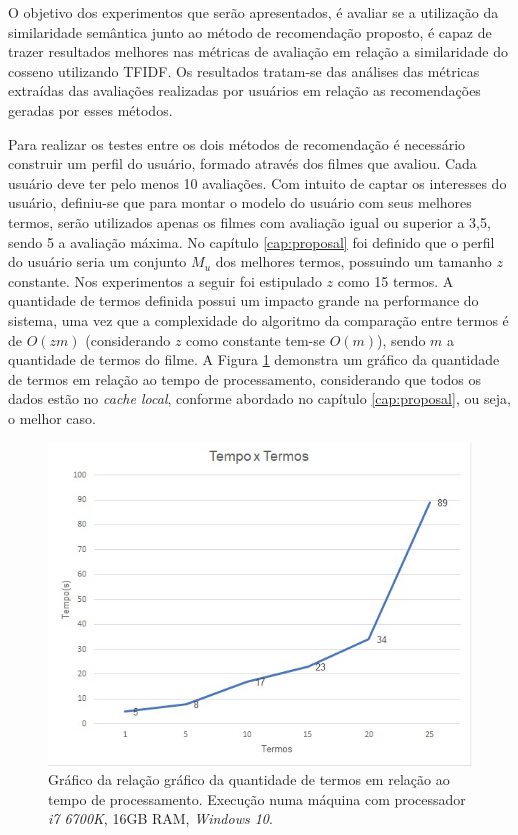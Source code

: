 O objetivo dos experimentos que serão apresentados, é avaliar se a utilização da similaridade semântica junto ao método de recomendação proposto, é capaz de trazer resultados melhores nas métricas de avaliação em relação a similaridade do cosseno utilizando \ac{TFIDF}.  Os resultados tratam-se das análises das métricas extraídas das avaliações realizadas por usuários em relação as recomendações geradas por esses métodos.

Para realizar os testes entre os dois métodos de recomendação é necessário construir um perfil do usuário,
formado através dos filmes que avaliou. Cada usuário deve ter pelo menos 10 avaliações. Com intuito de captar os interesses do usuário, definiu-se que para montar o modelo do usuário com seus melhores termos, serão utilizados apenas os filmes com avaliação igual ou superior a 3,5, sendo 5 a avaliação máxima. No capítulo \ref{cap:proposal} foi definido que o perfil do usuário seria um conjunto $M_u$ dos melhores termos, possuindo um tamanho $z$ constante. Nos experimentos a seguir foi estipulado $z$ como 15 termos. A quantidade de termos definida possui um impacto grande na performance do sistema, uma vez que a complexidade do algoritmo da comparação entre termos é de $O(zm)$ (considerando $z$ como constante tem-se $O(m)$), sendo $m$ a quantidade de termos do filme. A Figura \ref{fig:tempo_x_termos} demonstra um gráfico da quantidade de termos em relação ao tempo de processamento, considerando que todos os dados estão no \textit{cache local}, conforme abordado no capítulo \ref{cap:proposal}, ou seja, o melhor caso.

\begin{figure}
	\centering
	\includegraphics[scale=0.85]{imagens/tempo_x_termos.jpg}
	\caption{Gráfico da relação gráfico da quantidade de termos em relação ao tempo de processamento. Execução numa máquina com processador \textit{i7 6700K}, 16GB RAM, \textit{Windows 10}.}
	\label{fig:tempo_x_termos}
\end{figure}

